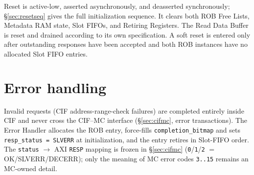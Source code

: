 Reset is active-low, asserted asynchronously, and deasserted synchronously;
\S\ref{sec:resetseq} gives the full initialization sequence.  It clears both
ROB Free Lists, Metadata RAM state, Slot FIFOs, and Retiring Registers.  The
Read Data Buffer is reset and drained according to its own specification.  A
soft reset is entered only after outstanding responses have been accepted and
both ROB instances have no allocated Slot FIFO entries.

\section{Error handling}

Invalid requests (CIF address-range-check failures) are completed entirely
inside CIF and never cross the CIF--MC interface (\S\ref{sec:cifmc}, error
transactions).  The Error Handler allocates the ROB entry, force-fills
\texttt{completion\_bitmap} and sets \texttt{resp\_status = SLVERR} at
initialization, and the entry retires in Slot-FIFO order.  The
\texttt{status} $\to$ AXI \texttt{RESP} mapping is frozen in \S\ref{sec:cifmc}
(\texttt{0}/\texttt{1}/\texttt{2} $=$ OK/SLVERR/DECERR); only the meaning of
MC error codes \texttt{3..15} remains an MC-owned detail.
